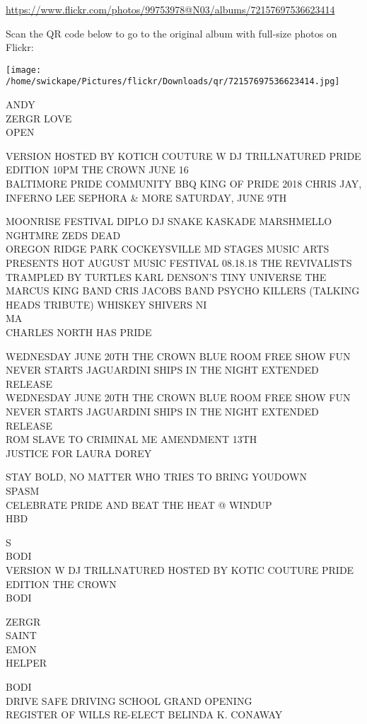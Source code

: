 \documentclass[10pt,letterpaper]{article}
\begin{document}
\url{https://www.flickr.com/photos/99753978@N03/albums/72157697536623414}

Scan the QR code below to go to the original album with full-size photos on Flickr:

\texttt{[image: /home/swickape/Pictures/flickr/Downloads/qr/72157697536623414.jpg]}


ANDY\\
ZERGR LOVE\\
OPEN

VERSION HOSTED BY KOTICH COUTURE W DJ TRILLNATURED PRIDE EDITION 10PM THE CROWN JUNE 16\\
BALTIMORE PRIDE COMMUNITY BBQ KING OF PRIDE 2018 CHRIS JAY, INFERNO LEE SEPHORA \& MORE SATURDAY, JUNE 9TH

MOONRISE FESTIVAL DIPLO DJ SNAKE KASKADE MARSHMELLO NGHTMRE ZEDS DEAD\\
OREGON RIDGE PARK COCKEYSVILLE MD STAGES MUSIC ARTS PRESENTS HOT AUGUST MUSIC FESTIVAL 08.18.18 THE REVIVALISTS TRAMPLED BY TURTLES KARL DENSON'S TINY UNIVERSE THE MARCUS KING BAND CRIS JACOBS BAND PSYCHO KILLERS (TALKING HEADS TRIBUTE) WHISKEY SHIVERS NI\\
MA\\
CHARLES NORTH HAS PRIDE

WEDNESDAY JUNE 20TH THE CROWN BLUE ROOM FREE SHOW FUN NEVER STARTS JAGUARDINI SHIPS IN THE NIGHT EXTENDED RELEASE\\
WEDNESDAY JUNE 20TH THE CROWN BLUE ROOM FREE SHOW FUN NEVER STARTS JAGUARDINI SHIPS IN THE NIGHT EXTENDED RELEASE\\
ROM SLAVE TO CRIMINAL ME AMENDMENT 13TH\\
JUSTICE FOR LAURA DOREY

STAY BOLD, NO MATTER WHO TRIES TO BRING YOUDOWN\\
SPASM\\
CELEBRATE PRIDE AND BEAT THE HEAT @ WINDUP\\
HBD

S\\
BODI\\
VERSION W DJ TRILLNATURED HOSTED BY KOTIC COUTURE PRIDE EDITION THE CROWN\\
BODI

ZERGR\\
SAINT\\
EMON\\
HELPER

BODI\\
DRIVE SAFE DRIVING SCHOOL GRAND OPENING\\
REGISTER OF WILLS RE{-}ELECT BELINDA K. CONAWAY
\end{document}
